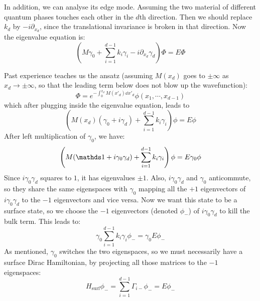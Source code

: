 \documentclass{article}
\begin{document}
In addition, we can analyse its edge mode. Assuming the two material of
different quantum phases touches each other in the $d$th direction. Then we
should replace $k_d$ by $-i\partial_{x_d}$, since the translational invariance is
broken in that direction. Now the eigenvalue equation is:
\begin{equation}
    ( M\gamma_0 + \sum_{i=1}^{d-1} k_i\gamma_i - i\partial_{x_d}\gamma_d ) \Phi
    = E \Phi
\end{equation}

Past experience teaches us the ansatz (assuming
$M(x_d)$ goes to $\pm\infty$ as $x_d\to\pm\infty$, so that the leading term below
does not blow up the wavefunction):
\begin{equation}
    \Phi = e^{-\int_0^{x_d} M(x'_d)\dd{x'_d}} \phi(x_1,\cdots,x_{d-1})
\end{equation}
which after plugging inside the eigenvalue equation, leads to
\begin{equation}
    \left( M(x_d)(\gamma_0 + i\gamma_d) + \sum_{i=1}^{d-1} k_i\gamma_i \right) \phi
    = E \phi
\end{equation}
After left multiplication of $\gamma_0$, we have:
\begin{equation}
    \left( M(\id + i\gamma_0\gamma_d) + \sum_{i=1}^{d-1} k_i\gamma_i  \right) \phi
    = E \gamma_0 \phi
\end{equation}
Since $i\gamma_0\gamma_d$ squares to $1$, it has eigenvalues $\pm1$. Also,
$i\gamma_0\gamma_d$ and $\gamma_0$ anticommute, so they share the same
eigenspaces with $\gamma_0$ mapping all the $+1$ eigenvectors of
$i\gamma_0\gamma_d$ to the $-1$ eigenvectors and vice versa. Now we want this
state to be a surface state, so we choose the $-1$ eigenvectors (denoted
$\phi_-$) of $i\gamma_0\gamma_d$ to kill the bulk term. This leads to:
\begin{equation}
    \gamma_0 \sum_{i=1}^{d-1} k_i\gamma_i \phi_- = \gamma_0 E\phi_-
\end{equation}
As mentioned, $\gamma_0$ switches the two eigenspaces, so we must necessarily
have a surface Dirac Hamiltonian, by projecting all those matrices to the $-1$
eigenspaces:
\begin{equation}
    \label{eq:H-Dirac-surf}
    H_\mathrm{surf} \phi_- = \sum_{i=1}^{d-1} \Gamma_{i-} \phi_- = E \phi_-
\end{equation}

\end{document}
